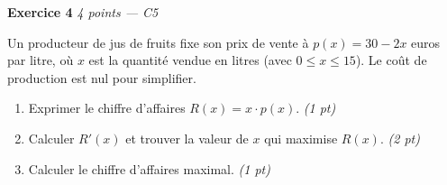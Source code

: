 \bigskip

\textbf{Exercice 4} \hfill \textit{4 points — C5}

Un producteur de jus de fruits fixe son prix de vente à $p(x) = 30 - 2x$ euros par litre, où $x$ est la quantité vendue en litres (avec $0 \leqslant x \leqslant 15$). Le coût de production est nul pour simplifier.

\begin{enumerate}
  \item Exprimer le chiffre d'affaires $R(x) = x \cdot p(x)$. \hfill \textit{(1 pt)}
  \item Calculer $R'(x)$ et trouver la valeur de $x$ qui maximise $R(x)$. \hfill \textit{(2 pt)}
  \item Calculer le chiffre d'affaires maximal. \hfill \textit{(1 pt)}
\end{enumerate}

